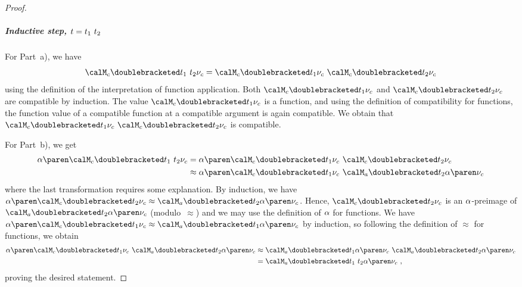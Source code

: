 \documentclass[../../diss.tex]{subfiles}
\begin{document}
\begin{proof}
    \subparagraph{Inductive step, $t = t_1 \  t_2$}
    For Part~a), we have
    \[
        \semc{t_1 \appl t_2}{\valc} = \semc{t_1}{\valc} \appl \semc{t_2}{\valc}
    \]
    using the definition of the interpretation of function application.
    Both $\semc{t_1}{\valc}$ and $\semc{t_2}{\valc}$ are compatible by induction.
    The value $\semc{t_1}{\valc}$ is a function, and using the definition of compatibility for functions, the function value of a compatible function at a compatible argument is again compatible.
    We obtain that $\semc{t_1}{\valc} \appl \semc{t_2}{\valc}$ is compatible.

    For Part~b), we get
    \begin{align*}
        \abs{ \semc{t_1 \appl t_2}{\valc} }
        &= \abs{ \semc{t_1}{\valc} \appl \semc{t_2}{\valc} }
        \\
        &\approx \abs{ \semc{t_1}{\valc} } \appl \sema{t_2}{\abs{\valc}}
    \end{align*}
    where the last transformation requires some explanation.
    By induction, we have $\abs{\semc{t_2}{\valc}} \approx \sema{t_2}{\abs{\valc}}$.
    Hence, $\semc{t_2}{\valc}$ is an $\abs$-preimage of $\sema{t_2}{\abs{\valc}}$ (modulo~$\approx$) and we may use the definition of $\abs$ for functions.
    We have $\abs{ \semc{t_1}{\valc} } \approx \sema{t_1}{\abs{\valc}}$ by induction, so following the definition of $\approx$ for functions, we obtain
    \begin{align*}
        \abs{ \semc{t_1}{\valc} } \appl \sema{t_2}{\abs{\valc}}
        & \approx \sema{t_1}{\abs{\valc}} \appl \sema{t_2}{\abs{\valc}}
        \\
        &= \sema{t_1 \appl t_2}{\abs{\valc}}
        \ ,
    \end{align*}
    proving the desired statement.


\end{proof}
\end{document}
